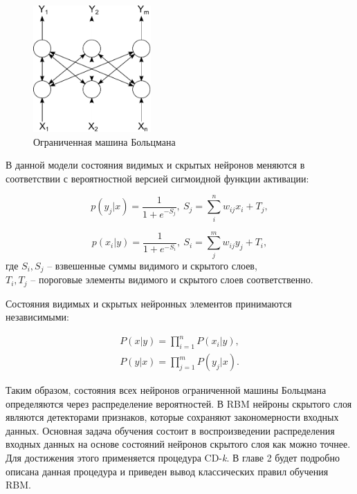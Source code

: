 \begin{figure}[H]
  \centering
  \includegraphics[width=0.4\textwidth]{man-source/images/ch1/pic1-3.pdf}
  \caption{Ограниченная машина Больцмана}
  \label{fig:pic1_3}
\end{figure}	

В данной модели состояния видимых и скрытых нейронов меняются в соответствии с вероятностной версией сигмоидной функции активации:
	
\begin{equation}
	p(y_j\lvert x)=\frac{1}{1+e^{-S_j}},\ S_j=\sum_i^n w_{ij}x_i+T_j,
\end{equation}
	
\begin{equation}
	p(x_i\lvert y)=\frac{1}{1+e^{-S_i}},\ S_i=\sum_j^m w_{ij}y_j+T_i,
\end{equation}
где $S_i, S_j$ -- взвешенные суммы видимого и скрытого слоев,\\
$T_i, T_j$ -- пороговые элементы видимого и скрытого слоев соответственно.
	
Состояния видимых и скрытых нейронных элементов принимаются независимыми:
	
\begin{equation*}
\begin{aligned}
	P(x \lvert y) = \prod_{i=1}^n P(x_i \lvert y),\\
	P(y \lvert x) = \prod_{j=1}^m P(y_j \lvert x).
\end{aligned}	
\end{equation*}
	
Таким образом, состояния всех нейронов ограниченной машины Больцмана определяются через распределение вероятностей. В RBM нейроны скрытого слоя являются детекторами признаков, которые сохраняют закономерности входных данных. Основная задача обучения состоит в воспроизведении распределения входных данных на основе состояний нейронов скрытого слоя как можно точнее. Для достижения этого применяется процедура CD-\textit{k}. В главе 2 будет подробно описана данная процедура и приведен вывод классических правил обучения RBM. %

